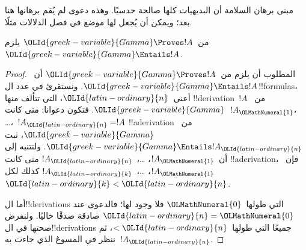 \documentclass[../../../include/open-logic-section]{subfiles}
\begin{document}


\begin{editorial}
  مبنى برهان السلامة أن البديهيات كلها صالحة حدسيًا. وهذه دعوى لم يُقم
  برهانها هنا بعد؛ ويمكن أن يُجعل لها موضع في فصل الدلالات مثلًا.
\end{editorial}

\begin{thm}[السلامة]
  من~${\OLId{greek-variable}{Gamma}} \Proves !A$ يلزم~${\OLId{greek-variable}{Gamma}} \Entails !A$.
\end{thm}

\begin{proof}
  المطلوب أن يلزم من~${\OLId{greek-variable}{Gamma}} \Proves !A$ أن~${\OLId{greek-variable}{Gamma}} \Entails !A$.
  ونستقرئ في عدد ال!!{formula}s، أعني~${\OLId{latin-ordinary}{n}}$، التي تتألف منها
  !!{derivation}~$!A$ من~${\OLId{greek-variable}{Gamma}}$. فتكون دعوانا: متى كانت~$!A_{\OLMathNumeral{1}}$،
  \dots،~$!A_{\OLId{latin-ordinary}{n}}=!A$ !!a{derivation} من~${\OLId{greek-variable}{Gamma}}$، ثبت
  ${\OLId{greek-variable}{Gamma}} \Entails !A_{\OLId{latin-ordinary}{n}}$. ولنتنبه إلى أن~$!A_{\OLMathNumeral{1}}$، \dots،~$!A_{\OLId{latin-ordinary}{n}}$
  متى كانت !!a{derivation}، فإن~$!A_{\OLMathNumeral{1}}$، \dots،~$!A_{\OLId{latin-ordinary}{k}}$ كذلك لكل~${\OLId{latin-ordinary}{k}}<{\OLId{latin-ordinary}{n}}$.

  أما ال!!{derivation}s التي طولها~${\OLMathNumeral{0}}$ فلا وجود لها؛ فالدعوى عند
  ${\OLId{latin-ordinary}{n}}={\OLMathNumeral{0}}$ صادقة صدقًا خاليًا. ولنفرض صحتها في ال!!{derivation}s جميعًا
  التي طولها~$<{\OLId{latin-ordinary}{n}}$، ثم ننظر في المسوغ الذي جاءت به~$!A_{\OLId{latin-ordinary}{n}}$.


\end{proof}
\end{document}
